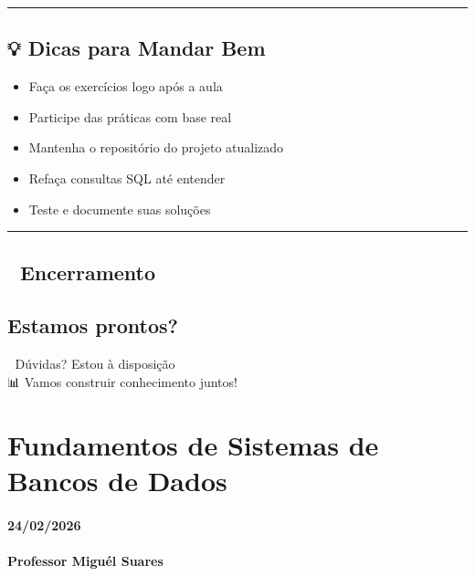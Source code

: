 \documentclass[
]{book}
\providecommand{\tightlist}{%
  \setlength{\itemsep}{0pt}\setlength{\parskip}{0pt}}
\begin{document}
\begin{center}\rule{0.5\linewidth}{0.5pt}\end{center}

\section{💡 Dicas para Mandar Bem}\label{dicas-para-mandar-bem}

\begin{itemize}
\tightlist
\item
  Faça os exercícios logo após a aula
\item
  Participe das práticas com base real
\item
  Mantenha o repositório do projeto atualizado
\item
  Refaça consultas SQL até entender
\item
  Teste e documente suas soluções
\end{itemize}

\begin{center}\rule{0.5\linewidth}{0.5pt}\end{center}

\section{🙌 Encerramento}\label{encerramento}

\section{Estamos prontos?}\label{estamos-prontos}

📧 Dúvidas? Estou à disposição\\
📊 Vamos construir conhecimento juntos!

\chapter{Fundamentos de Sistemas de Bancos de Dados}\label{fundamentos-de-sistemas-de-bancos-de-dados}

\subsubsection*{24/02/2026}\label{section-1}

\subsubsection*{Professor Miguél Suares}\label{professor-miguuxe9l-suares-1}
\end{document}
